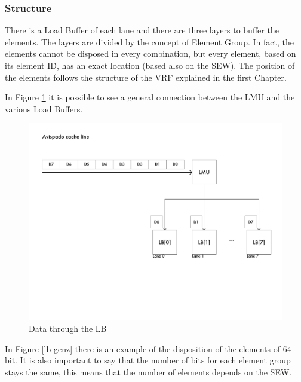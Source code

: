 \subsubsection{Structure}
There is a Load Buffer of each lane and there are three layers to buffer the elements. The layers are divided by the concept of Element Group. In fact, the elements cannot be disposed in every combination, but every element, based on its element ID, has an exact location (based also on the SEW). The position  of the elements follows the structure of the VRF explained in the first Chapter.

In Figure \ref{gen-ex} it is possible to see a general connection between the LMU and the various Load Buffers.

\begin{figure}[H]
    \centering
    \includegraphics[scale = 0.6]{Chapter_2/img/cache-to-lb-gen-ex.png}
    \caption{Data through the LB}
    \label{gen-ex}
\end{figure}


In Figure \ref{lb-genz} there is an example of the disposition of the elements of 64 bit. It is also important to say that the number of bits for each element group stays the same, this means that the number of elements depends on the SEW.


